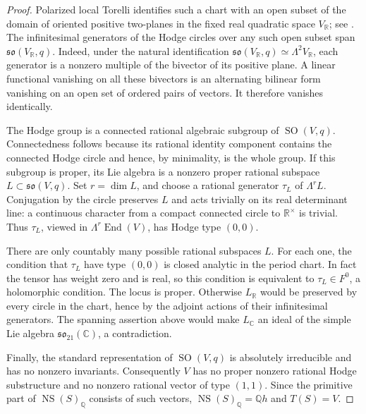 \begin{proof}
Polarized local Torelli identifies such a chart with an open subset of the
domain of oriented positive two-planes in the fixed real quadratic space
$V_{\mathbb R}$; see \cite[Chapter~6]{Huybrechts}.
The infinitesimal generators of the Hodge circles over any such open
subset span $\mathfrak{so}(V_{\mathbb R},q)$.  Indeed, under the natural
identification $\mathfrak{so}(V_{\mathbb R},q)\simeq\Lambda^2V_{\mathbb R}$,
each generator is a nonzero multiple of the bivector of its positive
plane.  A linear functional vanishing on all these bivectors is an
alternating bilinear form vanishing on an open set of ordered pairs of
vectors.  It therefore vanishes identically.

The Hodge group is a connected rational algebraic subgroup of
$\operatorname{SO}(V,q)$.  Connectedness follows because its rational
identity component contains the connected Hodge circle and hence, by
minimality, is the whole group.  If this subgroup is proper, its Lie
algebra is a nonzero proper rational subspace
$L\subset\mathfrak{so}(V,q)$.  Set $r=\dim L$, and choose a rational
generator $\tau_L$ of $\Lambda^rL$.  Conjugation by the circle preserves
$L$ and acts trivially on its real determinant line: a continuous
character from a compact connected circle to $\mathbb R^\times$ is
trivial.  Thus $\tau_L$, viewed in
$\Lambda^r\operatorname{End}(V)$, has Hodge type $(0,0)$.

There are only countably many possible rational subspaces $L$.
For each one, the condition that $\tau_L$ have type $(0,0)$ is closed
analytic in the period chart.  In fact the tensor has weight zero and is
real, so this condition is equivalent to $\tau_L\in F^0$, a holomorphic
condition.  The locus is proper.  Otherwise $L_{\mathbb R}$ would be
preserved by every circle in the chart, hence by the adjoint actions of
their infinitesimal generators.  The spanning assertion above would
make $L_{\mathbb C}$ an ideal of the simple Lie algebra
$\mathfrak{so}_{21}(\mathbb C)$, a contradiction.

Finally, the standard representation of $\operatorname{SO}(V,q)$ is
absolutely irreducible and has no nonzero invariants.  Consequently $V$
has no proper nonzero rational Hodge substructure and no nonzero
rational vector of type $(1,1)$.  Since the primitive part of
$\operatorname{NS}(S)_{\mathbb Q}$ consists of such vectors,
$\operatorname{NS}(S)_{\mathbb Q}=\mathbb Qh$ and $T(S)=V$.
\end{proof}

